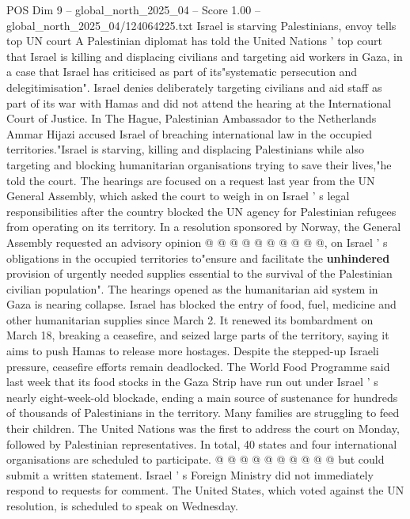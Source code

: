 \begin{textsample}{POS Dim 9 – global\_north\_2025\_04 – Score 1.00 – global\_north\_2025\_04/124064225.txt}  \label{ex:f9_pos_426}
Israel is starving Palestinians, envoy tells top UN court A Palestinian diplomat has told the United Nations ' top court that Israel is killing and displacing civilians and targeting aid workers in Gaza, in a case that Israel has criticised as part of its"systematic persecution and delegitimisation".
Israel denies deliberately targeting civilians and aid staff as part of its war with Hamas and did not attend the hearing at the International Court of Justice.
In The Hague, Palestinian Ambassador to the Netherlands Ammar Hijazi accused Israel of breaching international law in the occupied territories."Israel is starving, killing and displacing Palestinians while also targeting and blocking humanitarian organisations trying to save their lives,"he told the court.
The hearings are focused on a request last year from the UN General Assembly, which asked the court to weigh in on Israel ' s legal responsibilities after the country blocked the UN agency for Palestinian refugees from operating on its territory.
In a resolution sponsored by Norway, the General Assembly requested an advisory opinion @ @ @ @ @ @ @ @ @ @, on Israel ' s obligations in the occupied territories to"ensure and facilitate the \textbf{unhindered} provision of urgently needed supplies essential to the survival of the Palestinian civilian population".
The hearings opened as the humanitarian aid system in Gaza is nearing collapse.
Israel has blocked the entry of food, fuel, medicine and other humanitarian supplies since March 2.
It renewed its bombardment on March 18, breaking a ceasefire, and seized large parts of the territory, saying it aims to push Hamas to release more hostages.
Despite the stepped-up Israeli pressure, ceasefire efforts remain deadlocked.
The World Food Programme said last week that its food stocks in the Gaza Strip have run out under Israel ' s nearly eight-week-old blockade, ending a main source of sustenance for hundreds of thousands of Palestinians in the territory.
Many families are struggling to feed their children.
The United Nations was the first to address the court on Monday, followed by Palestinian representatives.
In total, 40 states and four international organisations are scheduled to participate. @ @ @ @ @ @ @ @ @ @ but could submit a written statement.
Israel ' s Foreign Ministry did not immediately respond to requests for comment.
The United States, which voted against the UN resolution, is scheduled to speak on Wednesday.

\end{textsample}
